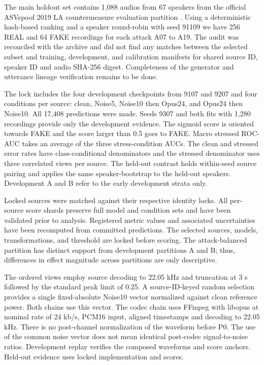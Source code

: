 The main holdout set contains 1,088 audios from 67 speakers from the official ASVspoof 2019 LA countermeasure evaluation partition \cite{asv19}. Using a deterministic hash-based ranking and a speaker round-robin with seed 91109 we have 256 REAL and 64 FAKE recordings for each attack A07 to A19. The audit was reconciled with the archive and did not find any matches between the selected subset and training, development, and calibration manifests for shared source ID, speaker ID and audio SHA-256 digest. Completeness of the generator and utterance lineage verification remains to be done.

The lock includes the four development checkpoints from 9107 and 9207 and four conditions per source: clean, Noise5, Noise10 then Opus24, and Opus24 then Noise10. All 17,408 predictions were made. Seeds 9307 and both fits with 1,280 recordings provide only the development evidence. The sigmoid score is oriented towards FAKE and the score larger than 0.5 goes to FAKE. Macro stressed ROC-AUC takes an average of the three stress-condition AUCs. The clean and stressed error rates have class-conditional denominators and the stressed denominator uses three correlated views per source. The held-out contrast holds within-seed source pairing and applies the same speaker-bootstrap to the held-out speakers. Development A and B refer to the early development strata only.

Locked sources were matched against their respective identity locks. All per-source score shards preserve full model and condition sets and have been validated prior to analysis. Registered metric values and associated uncertainties have been recomputed from committed predictions. The selected sources, models, transformations, and threshold are locked before scoring. The attack-balanced partition has distinct support from development partitions A and B; thus, differences in effect magnitude across partitions are only descriptive.

The ordered views employ source decoding to 22.05 kHz and truncation at 3 s followed by the standard peak limit of 0.25. A source-ID-keyed random selection provides a single fixed-absolute Noise10 vector normalized against clean reference power. Both chains use this vector. The codec chain uses FFmpeg with libopus at nominal rate of 24 kb/s, PCM16 input, aligned timestamps and decoding to 22.05 kHz. There is no post-channel normalization of the waveform before P0. The use of the common noise vector does not mean identical post-codec signal-to-noise ratios. Development replay verifies the composed waveforms and score anchors. Held-out evidence uses locked implementation and scores.

